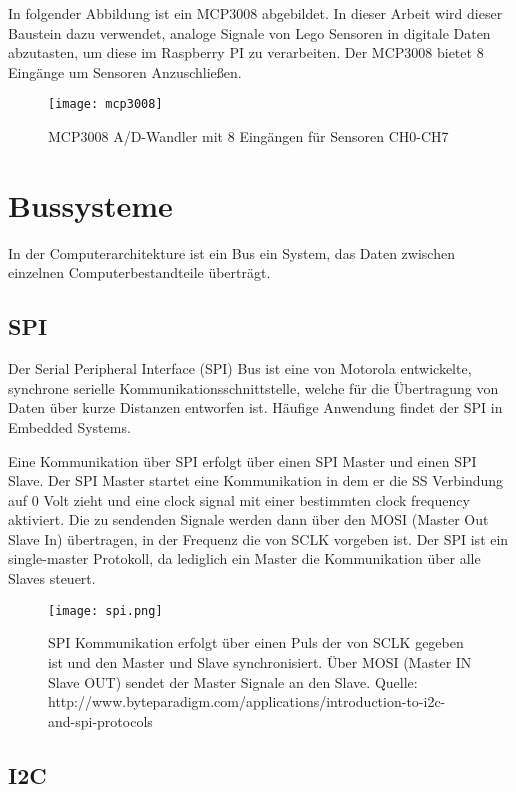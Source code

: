 In folgender Abbildung ist ein MCP3008 abgebildet. In dieser Arbeit wird dieser Baustein dazu verwendet, analoge Signale von Lego Sensoren in digitale Daten abzutasten, um diese im Raspberry PI zu verarbeiten. Der MCP3008 bietet 8 Eingänge um Sensoren Anzuschließen.

\begin{figure}[h]
  \centering
  \texttt{[image: mcp3008]}
  \caption{MCP3008 A/D-Wandler mit 8 Eingängen für Sensoren CH0-CH7}
  \label{Kap1:NXT}
\end{figure}

\section{Bussysteme}
In der Computerarchitekture ist ein Bus ein System, das Daten zwischen einzelnen Computerbestandteile überträgt.

\subsection{SPI}

Der Serial Peripheral Interface (SPI) Bus ist eine von Motorola entwickelte,  synchrone serielle Kommunikationsschnittstelle, welche für die Übertragung von Daten über kurze Distanzen entworfen ist.  Häufige Anwendung findet der SPI in Embedded Systems. 

Eine Kommunikation über SPI erfolgt über einen SPI Master und einen SPI Slave. Der SPI Master startet eine Kommunikation in dem er die SS Verbindung auf 0 Volt zieht und eine clock signal mit einer bestimmten clock frequency aktiviert. Die zu sendenden Signale werden dann über den MOSI (Master Out Slave In) übertragen, in der Frequenz die von SCLK vorgeben ist. Der SPI ist ein single-master Protokoll, da lediglich ein Master die Kommunikation über alle Slaves steuert.

\begin{figure}[h]
  \centering
  \texttt{[image: spi.png]}
  \caption{SPI Kommunikation erfolgt über einen Puls der von SCLK gegeben ist und den Master und Slave synchronisiert. Über MOSI (Master IN Slave OUT) sendet der Master Signale an den Slave. Quelle: http://www.byteparadigm.com/applications/introduction-to-i2c-and-spi-protocols}
  \label{Kap1:SPI}
\end{figure}

\subsection{I2C}

